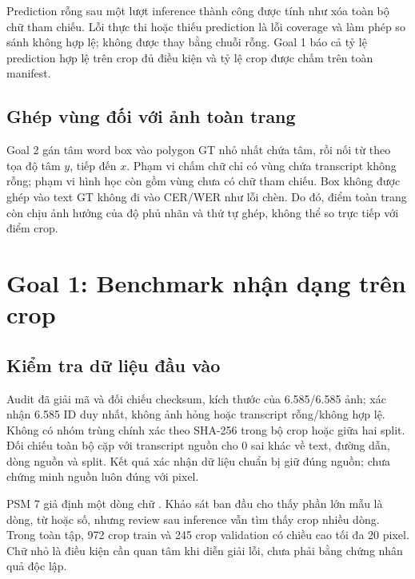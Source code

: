 \documentclass[11pt,a4paper]{article}
\begin{document}
Prediction rỗng sau một lượt inference thành công được tính như xóa toàn bộ chữ tham chiếu. Lỗi thực thi hoặc thiếu prediction là lỗi coverage và làm phép so sánh không hợp lệ; không được thay bằng chuỗi rỗng. Goal 1 báo cả tỷ lệ prediction hợp lệ trên crop đủ điều kiện và tỷ lệ crop được chấm trên toàn manifest.

\subsection{Ghép vùng đối với ảnh toàn trang}
Goal 2 gán tâm word box vào polygon GT nhỏ nhất chứa tâm, rồi nối từ theo tọa độ tâm $y$, tiếp đến $x$. Phạm vi chấm chữ chỉ có vùng chứa transcript không rỗng; phạm vi hình học còn gồm vùng chưa có chữ tham chiếu. Box không được ghép vào text GT không đi vào CER/WER như lỗi chèn. Do đó, điểm toàn trang còn chịu ảnh hưởng của độ phủ nhãn và thứ tự ghép, không thể so trực tiếp với điểm crop.

\clearpage
\section{Goal 1: Benchmark nhận dạng trên crop}
\subsection{Kiểm tra dữ liệu đầu vào}
Audit đã giải mã và đối chiếu checksum, kích thước của 6.585/6.585 ảnh; xác nhận 6.585 ID duy nhất, không ảnh hỏng hoặc transcript rỗng/không hợp lệ. Không có nhóm trùng chính xác theo SHA-256 trong bộ crop hoặc giữa hai split. Đối chiếu toàn bộ cặp với transcript nguồn cho 0 sai khác về text, đường dẫn, dòng nguồn và split. Kết quả xác nhận dữ liệu chuẩn bị giữ đúng nguồn; chưa chứng minh nguồn luôn đúng với pixel.

PSM 7 giả định một dòng chữ \cite{tesseract}. Khảo sát ban đầu cho thấy phần lớn mẫu là dòng, từ hoặc số, nhưng review sau inference vẫn tìm thấy crop nhiều dòng. Trong toàn tập, 972 crop train và 245 crop validation có chiều cao tối đa 20 pixel. Chữ nhỏ là điều kiện cần quan tâm khi diễn giải lỗi, chưa phải bằng chứng nhân quả độc lập.
\end{document}
